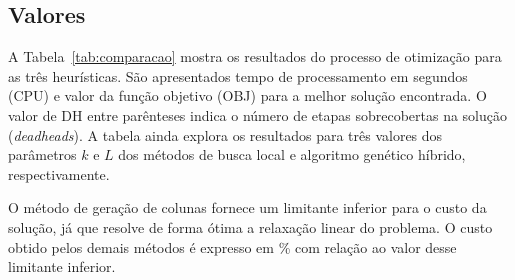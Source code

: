 \subsection{Valores}
\label{sec:valores}

A Tabela~\ref{tab:comparacao} mostra os resultados do processo de otimização para as três
heurísticas. São apresentados tempo de processamento em segundos (CPU) e valor da função objetivo
(OBJ) para a melhor solução encontrada. O valor de DH entre parênteses indica o número de etapas
sobrecobertas na solução ({\it deadheads}). A tabela ainda explora os resultados para três valores
dos parâmetros $k$ e $L$ dos métodos de busca local e algoritmo genético híbrido, respectivamente.

O método de geração de colunas fornece um limitante inferior para o custo da solução, já que resolve
de forma ótima a relaxação linear do problema. O custo obtido pelos demais métodos é expresso em
\% com relação ao valor desse limitante inferior.

